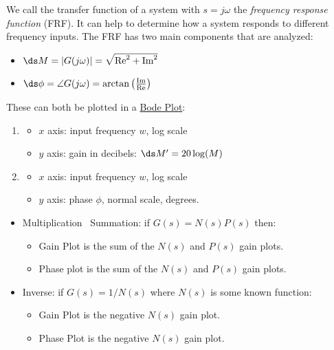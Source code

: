 \documentclass{article}
\begin{document}
We call the transfer function of a system with $s = j\omega$ the \textit{frequency response function} (FRF). It can help to determine how a system responds to different frequency inputs. The FRF has two main components that are analyzed:
\begin{itemize}
\item {} $\ds M = |G(j\omega)| = \sqrt{\text{Re}^2 + \text{Im}^2}$
\item {} $\ds \phi = \angle G(j\omega) = \arctan \left(\frac{\text{Im}}{\text{Re}}\right)$
\end{itemize}
These can both be plotted in a \underline{Bode Plot}:
\begin{enumerate}
\item {}
  \begin{itemize}
  \item $x$ axis: input frequency $w$, log scale
  \item $y$ axis: gain in decibels: $\ds M' = 20 \log(M)$
  \end{itemize}
\item {}
  \begin{itemize}
  \item $x$ axis: input frequency $w$, log scale
  \item $y$ axis: phase $\phi$, normal scale, degrees.
  \end{itemize}
\end{enumerate}

\begin{itemize}
\item Multiplication \to\, Summation: if $G(s) = N(s)P(s)$ then:
  \begin{itemize}
  \item Gain Plot is the sum of the $N(s)$ and $P(s)$ gain plots.
  \item Phase plot is the sum of the $N(s)$ and $P(s)$ gain plots.
  \end{itemize}
\item Inverse: if $G(s) = 1/N(s)$ where $N(s)$ is some known function:
  \begin{itemize}
  \item Gain Plot is the negative $N(s)$ gain plot.
  \item Phase Plot is the negative $N(s)$ gain plot.
  \end{itemize}
\end{itemize}
\end{document}

